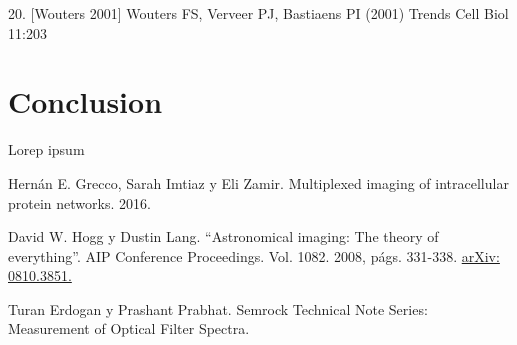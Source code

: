 \documentclass{ctuthesis}
\begin{document}
20. [Wouters 2001] Wouters FS, Verveer PJ, Bastiaens PI (2001) Trends Cell Biol 11:203
\chapter{Conclusion}

Lorep ipsum \cite{doe}


\renewcommand\bibname{Referencias Bibliográficas}
\begin{thebibliography}{1}

 Hernán E. Grecco, Sarah Imtiaz y Eli Zamir. Multiplexed
imaging of intracellular protein networks. 2016.

 David W. Hogg y Dustin Lang. “Astronomical imaging: The
	theory of everything”. AIP Conference Proceedings. Vol. 1082.
	2008, págs. 331-338. \href{https://arxiv.org/pdf/0810.3851.pdf}{arXiv: 
	0810.3851.}

 Turan Erdogan y Prashant Prabhat. Semrock Technical Note 
Series: Measurement of 
Optical Filter Spectra. 

\end{thebibliography}
\end{document}
